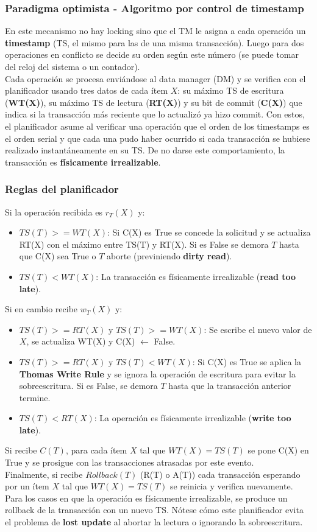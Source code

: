 \subsubsection*{Paradigma optimista - Algoritmo por control de timestamp}
En este mecanismo no hay locking sino que el TM le asigna a cada operación un \textbf{timestamp} (TS, el mismo para las de una misma transacción). Luego para dos operaciones en conflicto se decide su orden según este número (se puede tomar del reloj del sistema o un contador). \\
Cada operación se procesa enviándose al data manager (DM) y se verifica con el planificador usando tres datos de cada ítem $X$: su máximo TS de escritura (\textbf{WT(X)}), su máximo TS de lectura (\textbf{RT(X)}) y su bit de commit (\textbf{C(X)}) que indica si la transacción más reciente que lo actualizó ya hizo commit. Con estos, el planificador asume al verificar una operación que el orden de los timestamps es el orden serial y que cada una pudo haber ocurrido si cada transacción se hubiese realizado instantáneamente en su TS. De no darse este comportamiento, la transacción es \textbf{físicamente irrealizable}.

\subsubsection*{Reglas del planificador}
Si la operación recibida es $r_T(X)$ y:
\begin{itemize}
    \item $TS(T) >= WT(X)$: Si C(X) es True se concede la solicitud y se actualiza RT(X) con el máximo entre TS(T) y RT(X). Si es False se demora $T$ hasta que C(X) sea True o $T$ aborte (previniendo \textbf{dirty read}).
    \item $TS(T) < WT(X)$: La transacción es físicamente irrealizable (\textbf{read too late}).
\end{itemize}
Si en cambio recibe $w_T(X)$ y:
\begin{itemize}
    \item $TS(T) >= RT(X)$ y $TS(T) >= WT(X)$: Se escribe el nuevo valor de $X$, se actualiza WT(X) y C(X) $\leftarrow$ False.
    \item $TS(T) >= RT(X)$ y $TS(T) < WT(X)$: Si C(X) es True se aplica la \textbf{Thomas Write Rule} y se ignora la operación de escritura para evitar la sobreescritura. Si es False, se demora $T$ hasta que la transacción anterior termine.
    \item $TS(T) < RT(X)$: La operación es físicamente irrealizable (\textbf{write too late}).
\end{itemize}
Si recibe $C(T)$, para cada ítem $X$ tal que $WT(X) = TS(T)$ se pone C(X) en True y se prosigue con las transacciones atrasadas por este evento. \\
Finalmente, si recibe $Rollback(T)$ (R(T) o A(T)) cada transacción esperando por un ítem $X$ tal que $WT(X) = TS(T)$ se reinicia y verifica nuevamente. \\
Para los casos en que la operación es físicamente irrealizable, se produce un rollback de la transacción con un nuevo TS. Nótese cómo este planificador evita el problema de \textbf{lost update} al abortar la lectura o ignorando la sobreescritura.

